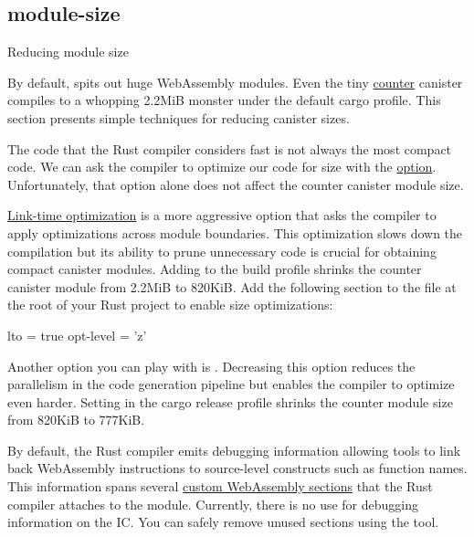 \documentclass{article}
\begin{document}
\subsection{module-size}{Reducing module size}

By default,  spits out huge WebAssembly modules.
Even the tiny \href{https://github.com/dfinity/cdk-rs/tree/58d276340c2592aa9dcbc4a3e79ef4ac4fca023b/examples/counter/src/counter_rs}{counter} canister compiles to a whopping 2.2MiB monster under the default cargo  profile.
This section presents simple techniques for reducing canister sizes.


The code that the Rust compiler considers fast is not always the most compact code.
We can ask the compiler to optimize our code for size with the  \href{https://doc.rust-lang.org/cargo/reference/profiles.html#opt-level}{option}.
Unfortunately, that option alone does not affect the counter canister module size.

\href{https://doc.rust-lang.org/cargo/reference/profiles.html#lto}{Link-time optimization} is a more aggressive option that asks the compiler to apply optimizations across module boundaries.
This optimization slows down the compilation but its ability to prune unnecessary code is crucial for obtaining compact canister modules.
Adding  to the build profile shrinks the counter canister module from 2.2MiB to 820KiB.
Add the following section to the  file at the root of your Rust project to enable size optimizations:

\begin{code}
lto = true
opt-level = 'z'
\end{code}

Another option you can play with is \href{https://doc.rust-lang.org/cargo/reference/profiles.html#codegen-units}{}.
Decreasing this option reduces the parallelism in the code generation pipeline but enables the compiler to optimize even harder.
Setting  in the cargo release profile shrinks the counter module size from 820KiB to 777KiB.


By default, the Rust compiler emits debugging information allowing tools to link back WebAssembly instructions to source-level constructs such as function names.
This information spans several \href{https://webassembly.github.io/spec/core/binary/modules.html#custom-section}{custom WebAssembly sections} that the Rust compiler attaches to the module.
Currently, there is no use for debugging information on the IC.
You can safely remove unused sections using the \href{https://github.com/dfinity/ic-wasm}{} tool.
\end{document}
